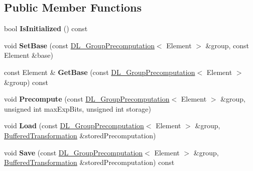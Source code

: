 \subsection*{Public Member Functions}
\begin{DoxyCompactItemize}
\item 
\hypertarget{class_d_l___fixed_base_precomputation_impl_a6771d6d07ad3a2e90f2b673e78fa2cfe}{
bool {\bfseries IsInitialized} () const }
\label{class_d_l___fixed_base_precomputation_impl_a6771d6d07ad3a2e90f2b673e78fa2cfe}

\item 
\hypertarget{class_d_l___fixed_base_precomputation_impl_a84f4151f6ffb1b05b8f0efccd120d169}{
void {\bfseries SetBase} (const \hyperlink{class_d_l___group_precomputation}{DL\_\-GroupPrecomputation}$<$ Element $>$ \&group, const Element \&base)}
\label{class_d_l___fixed_base_precomputation_impl_a84f4151f6ffb1b05b8f0efccd120d169}

\item 
\hypertarget{class_d_l___fixed_base_precomputation_impl_afde21d3e59675149c4a6f584073a512b}{
const Element \& {\bfseries GetBase} (const \hyperlink{class_d_l___group_precomputation}{DL\_\-GroupPrecomputation}$<$ Element $>$ \&group) const }
\label{class_d_l___fixed_base_precomputation_impl_afde21d3e59675149c4a6f584073a512b}

\item 
\hypertarget{class_d_l___fixed_base_precomputation_impl_aaef0287112a39612d23c00fa6ceb4782}{
void {\bfseries Precompute} (const \hyperlink{class_d_l___group_precomputation}{DL\_\-GroupPrecomputation}$<$ Element $>$ \&group, unsigned int maxExpBits, unsigned int storage)}
\label{class_d_l___fixed_base_precomputation_impl_aaef0287112a39612d23c00fa6ceb4782}

\item 
\hypertarget{class_d_l___fixed_base_precomputation_impl_a15b52a9f5d25dedceb7fb88ddef3eee0}{
void {\bfseries Load} (const \hyperlink{class_d_l___group_precomputation}{DL\_\-GroupPrecomputation}$<$ Element $>$ \&group, \hyperlink{class_buffered_transformation}{BufferedTransformation} \&storedPrecomputation)}
\label{class_d_l___fixed_base_precomputation_impl_a15b52a9f5d25dedceb7fb88ddef3eee0}

\item 
\hypertarget{class_d_l___fixed_base_precomputation_impl_a97a6d749b71e53d1eb685bb2d9c8b7f2}{
void {\bfseries Save} (const \hyperlink{class_d_l___group_precomputation}{DL\_\-GroupPrecomputation}$<$ Element $>$ \&group, \hyperlink{class_buffered_transformation}{BufferedTransformation} \&storedPrecomputation) const }
\label{class_d_l___fixed_base_precomputation_impl_a97a6d749b71e53d1eb685bb2d9c8b7f2}


\end{DoxyCompactItemize}
